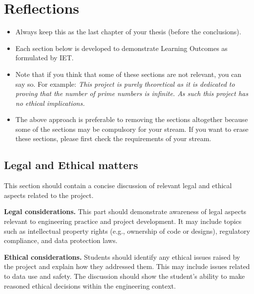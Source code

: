 \doublespacing %

\chapter{Reflections}
\label{chLast}

\begin{spacing}{1} %
\minitoc %
\end{spacing} %
\thesisspacing %

{\color{red}
\begin{itemize}
\item Always keep this as the last chapter of your thesis (before the conclusions).
\item Each section below is developed to demonstrate Learning Outcomes as formulated by IET.
\item Note that if you think that some of these sections are not relevant, you can say so. For example: \textit{This project is purely theoretical as it is dedicated to proving that the number of prime numbers is infinite. As such this project has no ethical implications.}
\item The above approach is preferable to removing the sections altogether because some of the sections may be compulsory for your stream.
If you want to erase these sections, please first check the requirements of your stream.
\end{itemize}}


\section{Legal and Ethical matters}

This section should contain a concise discussion of relevant legal and ethical aspects related to the project.

\textbf{Legal considerations.}
This part should demonstrate awareness of legal aspects relevant to engineering practice and project development. It may include topics such as intellectual property rights (e.g., ownership of code or designs), regulatory compliance, and data protection laws.

\smallskip

\textbf{Ethical considerations.}
Students should identify any ethical issues raised by the project and explain how they addressed them. This may include issues related to data use and safety. The discussion should show the student's ability to make reasoned ethical decisions within the engineering context.





